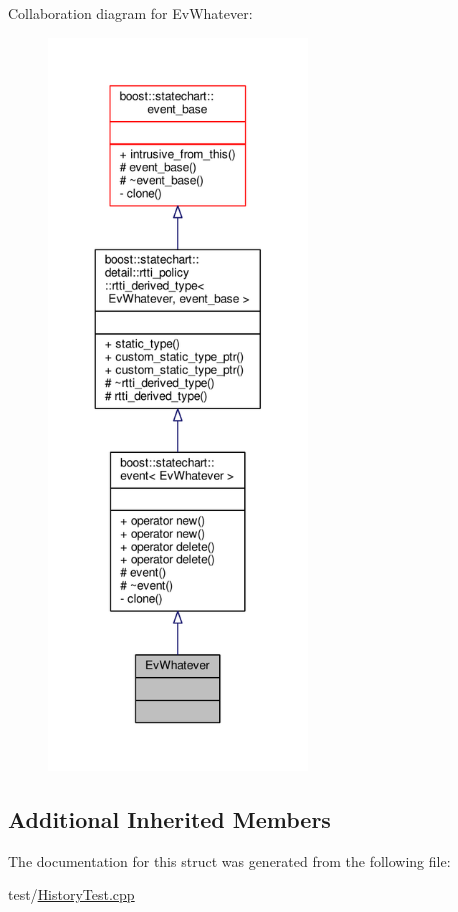 Collaboration diagram for Ev\+Whatever\+:
\nopagebreak
\begin{figure}[H]
\begin{center}
\leavevmode
\includegraphics[height=550pt]{struct_ev_whatever__coll__graph}
\end{center}
\end{figure}
\subsection*{Additional Inherited Members}


The documentation for this struct was generated from the following file\+:\begin{DoxyCompactItemize}
\item 
test/\mbox{\hyperlink{_history_test_8cpp}{History\+Test.\+cpp}}\end{DoxyCompactItemize}
